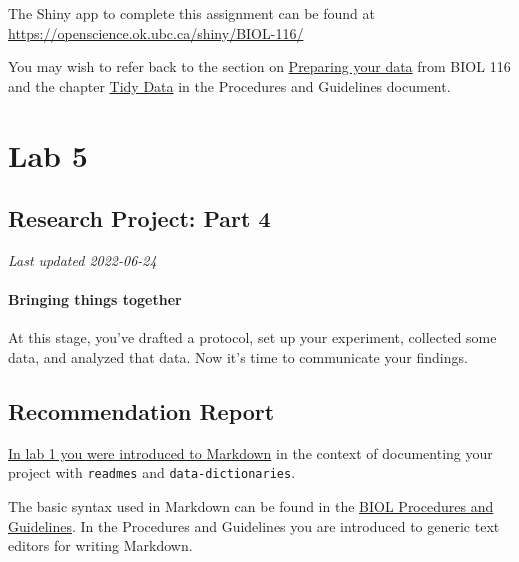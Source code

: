 \documentclass[
]{book}
\begin{document}
The Shiny app to complete this assignment can be found at \url{https://openscience.ok.ubc.ca/shiny/BIOL-116/}

You may wish to refer back to the section on \href{https://ubco-biology.github.io/BIOL-116-Lab-Manual/preparing-your-data.html}{Preparing your data} from BIOL 116 and the chapter \href{https://ubco-biology.github.io/Procedures-and-Guidelines/tidy-data.html}{Tidy Data} in the Procedures and Guidelines document.

\hypertarget{part-lab-5}{%
\part*{Lab 5}\label{part-lab-5}}

\hypertarget{research-project-part-4}{%
\chapter*{Research Project: Part 4}\label{research-project-part-4}}

\emph{Last updated 2022-06-24}

\hypertarget{bringing-things-together}{%
\subsection*{Bringing things together}\label{bringing-things-together}}

At this stage, you've drafted a protocol, set up your experiment, collected some data, and analyzed that data. Now it's time to communicate your findings.

\hypertarget{recommendation-report}{%
\chapter*{Recommendation Report}\label{recommendation-report}}

\href{https://ubco-biology.github.io/Procedures-and-Guidelines/readme-files-and-data-dictionaries.html\#markdown}{In lab 1 you were introduced to Markdown} in the context of documenting your project with \texttt{readmes} and \texttt{data-dictionaries}.

The basic syntax used in Markdown can be found in the \href{https://ubco-biology.github.io/Procedures-and-Guidelines/markdown-1.html}{BIOL Procedures and Guidelines}. In the Procedures and Guidelines you are introduced to generic text editors for writing Markdown.
\end{document}
